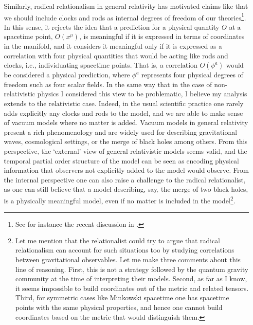 \documentclass[12 pt]{article}
\begin{document}
Similarly, radical relationalism in general relativity has motivated claims like that we should include clocks and rods as internal degrees of freedom of our theories\footnote{See for instance the recent discussion in \citep{Marchetti2021}.}. In this sense, it rejects the idea that a prediction for a physical quantity $O$ at a spacetime point, $O(x^{\mu})$, is meaningful if it is expressed in terms of coordinates in the manifold, and it considers it meaningful only if it is expressed as a correlation with four physical quantities that would be acting like rods and clocks, i.e., individuating spacetime points. That is, a correlation $O(\phi^a)$ would be considered a physical prediction, where $\phi^a$ represents four physical degrees of freedom such as four scalar fields. In the same way that in the case of non-relativistic physics I considered this view to be problematic, I believe my analysis extends to the relativistic case. Indeed, in the usual scientific practice one rarely adds explicitly any clocks and rods to the model, and we are able to make sense of vacuum models where no matter is added. Vacuum models in general relativity present a rich phenomenology and are widely used for describing gravitational waves, cosmological settings, or the merge of black holes among others. From this perspective, the `external' view of general relativistic models seems valid, and the temporal partial order structure of the model can be seen as encoding physical information that observers not explicitly added to the model would observe. From the internal perspective one can also raise a challenge to the radical relationalist, as one can still believe that a model describing, say, the merge of two black holes, is a physically meaningful model, even if no matter is included in the model\footnote{Let me mention that the relationalist could try to argue that radical relationalism can account for such situations too by studying correlations between gravitational observables. Let me make three comments about this line of reasoning. First, this is not a strategy followed by the quantum gravity community at the time of interpreting their models. Second, as far as I know, it seems impossible to build coordinates out of the metric and related tensors. Third, for symmetric cases like Minkowski spacetime one has spacetime points with the same physical properties, and hence one cannot build coordinates based on the metric that would distinguish them.}.
\end{document}
